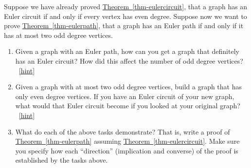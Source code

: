 \documentclass{book}
\begin{document}
\setcounter{project}{15}
\addtocounter{project}{-1}
\begin{activity}[]\label{activity-10}
\hypertarget{p-180}{}%
Suppose we have already proved \hyperref[thm-eulercircuit]{Theorem~\ref{thm-eulercircuit}}, that a graph has an Euler circuit if and only if every vertex has even degree.  Suppose now we want to prove \hyperref[thm-eulerpath]{Theorem~\ref{thm-eulerpath}}, that a graph has an Euler path if and only if it has at most two odd degree vertices.%
\begin{enumerate}[font=\bfseries,label=(\alph*),ref=\alph*]
\item\label{task-13} \hypertarget{p-181}{}%
Given a graph with an Euler path, how can you get a graph that definitely has an Euler circuit?  How did this affect the number of odd degree vertices?%
~\hfill{\tiny\hyperlink{a-15.a}{[hint]}\hypertarget{q-15.a}{}}\item\label{task-14} \hypertarget{p-186}{}%
Given a graph with at most two odd degree vertices, build a graph that has only even degree vertices.  If you have an Euler circuit of your new graph, what would that Euler circuit become if you looked at your original graph?%
~\hfill{\tiny\hyperlink{a-15.b}{[hint]}\hypertarget{q-15.b}{}}\item\label{task-15} \hypertarget{p-190}{}%
What do each of the above tasks demonstrate?  That is, write a proof of \hyperref[thm-eulerpath]{Theorem~\ref{thm-eulerpath}} assuming \hyperref[thm-eulercircuit]{Theorem~\ref{thm-eulercircuit}}.  Make sure you specify how each ``direction'' (implication and converse) of the proof is established by the tasks above.%
\end{enumerate}
\end{activity}
\end{document}
